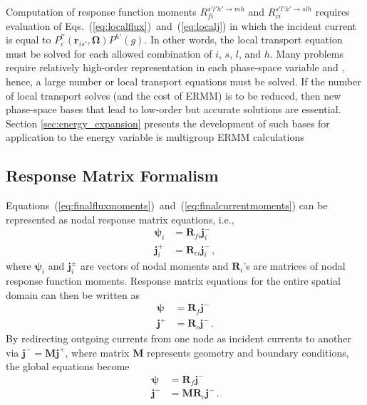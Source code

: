 \documentclass[5p,times,twocolumn,10pt]{elsarticle}
\newcommand{\EQSTWO}[2]{Eqs.~(\ref{#1})~and~(\ref{#2})}
\newcommand{\EQUATIONSTWO}[2]{Equations~(\ref{#1})~and~(\ref{#2})}
\begin{document}
    Computation of response function moments $R^{s'l'h' \to mh}_{fi}$ and 
    $R^{s'l'h' \to slh}_{ci}$ requires evaluation of 
    \EQSTWO{eq:localflux}{eq:localj} in which the incident current is equal to 
    $P^{l'}_c(\mathbf{r}_{is'}, \bm{\Omega}) P^{h'}(g)$. In other words, the 
    local transport equation must be solved for each allowed combination 
    of $i$, $s$, $l$, and $h$. Many problems require relatively high-order 
    representation in each phase-space variable and , hence, a large number or 
    local transport equations must be solved.  If the number of local transport 
    solves (and the cost of ERMM) is to be reduced, then new phase-space bases 
    that lead to low-order but accurate solutions are essential.  Section 
    \ref{sec:energy_expansion} 
    presents the development of such bases for application to the energy 
    variable is multigroup ERMM calculations
    
    \subsection{Response Matrix Formalism}
    
    \EQUATIONSTWO{eq:finalfluxmoments}{eq:finalcurrentmoments} can be 
    represented as nodal response matrix equations, i.e.,
    \begin{equation}
        \begin{split}
            \bm{\psi}_i    &=  \mathbf{R}_{fi}  \mathbf{j}^-_i  \\ 
            \mathbf{j}^+_i &=  \mathbf{R}_{ci} \mathbf{j}^-_i  \, ,
        \end{split}
    \end{equation}
    where  $\bm{\psi}_i$ and $\mathbf{j}^{\pm}_i$ are vectors of nodal moments 
    and $\mathbf{R}_i$'s are matrices of nodal response function moments. 
    Response matrix equations for the entire spatial domain can then be written 
    as
    \begin{equation}
        \begin{split}
            \bm{\psi}    &= \mathbf{R}_{f} \mathbf{j}^-  \\
            \mathbf{j}^+ &= \mathbf{R}_{c}  \mathbf{j}^- \, .
        \end{split}
    \end{equation}
    By redirecting outgoing currents from one node as incident currents to 
    another via $\mathbf{j}^- = \mathbf{Mj}^+$, where matrix $\mathbf{M}$ 
    represents geometry and boundary conditions, the global equations become
    \begin{equation}
        \begin{split}
            \bm{\psi}    &= \mathbf{R}_{f}  \mathbf{j}^-  \\
            \mathbf{j}^- &= \mathbf{MR}_{c}   \mathbf{j}^- \, .
            \label{eq:globalrme}
        \end{split}
    \end{equation}
    
\end{document}
